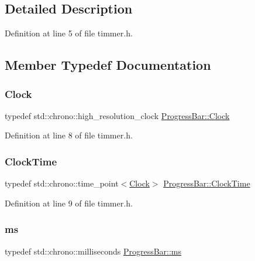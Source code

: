 \subsection{Detailed Description}


Definition at line 5 of file timmer.\+h.



\subsection{Member Typedef Documentation}
\mbox{\label{class_progress_bar_a97494459f2f389b8d0acc95c3a5f25f2}} 
\subsubsection{\texorpdfstring{Clock}{Clock}}
{\footnotesize\ttfamily typedef std\+::chrono\+::high\+\_\+resolution\+\_\+clock \mbox{\hyperlink{class_progress_bar_a97494459f2f389b8d0acc95c3a5f25f2}{Progress\+Bar\+::\+Clock}}}



Definition at line 8 of file timmer.\+h.

\mbox{\label{class_progress_bar_a6eb286aadc031d8e34de2a0193c490fa}} 
\subsubsection{\texorpdfstring{Clock\+Time}{ClockTime}}
{\footnotesize\ttfamily typedef std\+::chrono\+::time\+\_\+point$<$\mbox{\hyperlink{class_progress_bar_a97494459f2f389b8d0acc95c3a5f25f2}{Clock}}$>$ \mbox{\hyperlink{class_progress_bar_a6eb286aadc031d8e34de2a0193c490fa}{Progress\+Bar\+::\+Clock\+Time}}}



Definition at line 9 of file timmer.\+h.

\mbox{\label{class_progress_bar_a72afdba302062f07d2720ebfd510d7e2}} 
\subsubsection{\texorpdfstring{ms}{ms}}
{\footnotesize\ttfamily typedef std\+::chrono\+::milliseconds \mbox{\hyperlink{class_progress_bar_a72afdba302062f07d2720ebfd510d7e2}{Progress\+Bar\+::ms}}}



